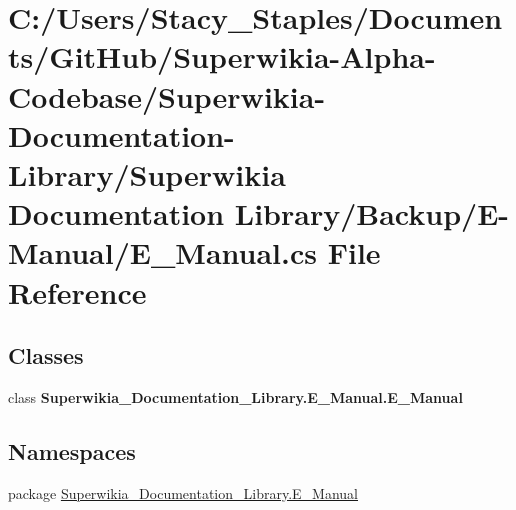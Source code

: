\hypertarget{_backup_2_e-_manual_2_e___manual_8cs}{\section{C\+:/\+Users/\+Stacy\+\_\+\+Staples/\+Documents/\+Git\+Hub/\+Superwikia-\/\+Alpha-\/\+Codebase/\+Superwikia-\/\+Documentation-\/\+Library/\+Superwikia Documentation Library/\+Backup/\+E-\/\+Manual/\+E\+\_\+\+Manual.cs File Reference}
\label{_backup_2_e-_manual_2_e___manual_8cs}
}
\subsection*{Classes}
\begin{DoxyCompactItemize}
\item 
class {\bfseries Superwikia\+\_\+\+Documentation\+\_\+\+Library.\+E\+\_\+\+Manual.\+E\+\_\+\+Manual}
\end{DoxyCompactItemize}
\subsection*{Namespaces}
\begin{DoxyCompactItemize}
\item 
package \hyperlink{namespace_superwikia___documentation___library_1_1_e___manual}{Superwikia\+\_\+\+Documentation\+\_\+\+Library.\+E\+\_\+\+Manual}
\end{DoxyCompactItemize}
